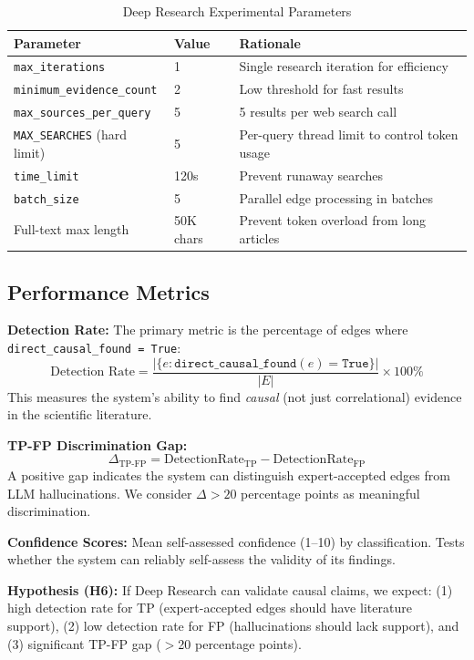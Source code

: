 \begin{table}[H]
\centering
\caption{Deep Research Experimental Parameters}
\label{tab:dr_params}
\footnotesize
\begin{tabular}{@{}l l l@{}}
\toprule
\textbf{Parameter} & \textbf{Value} & \textbf{Rationale} \\
\midrule
\texttt{max\_iterations} & 1 & Single research iteration for efficiency \\
\texttt{minimum\_evidence\_count} & 2 & Low threshold for fast results \\
\texttt{max\_sources\_per\_query} & 5 & 5 results per web search call \\
\texttt{MAX\_SEARCHES} (hard limit) & 5 & Per-query thread limit to control token usage \\
\texttt{time\_limit} & 120s & Prevent runaway searches \\
\texttt{batch\_size} & 5 & Parallel edge processing in batches \\
Full-text max length & 50K chars & Prevent token overload from long articles \\
\bottomrule
\end{tabular}
\end{table}

\subsection{Performance Metrics}

\textbf{Detection Rate:} The primary metric is the percentage of edges where \texttt{direct\_causal\_found = True}:
\[
\text{Detection Rate} = \frac{|\{e : \texttt{direct\_causal\_found}(e) = \texttt{True}\}|}{|E|} \times 100\%
\]
This measures the system's ability to find \textit{causal} (not just correlational) evidence in the scientific literature.

\textbf{TP-FP Discrimination Gap:}
\[
\Delta_{\text{TP-FP}} = \text{DetectionRate}_{\text{TP}} - \text{DetectionRate}_{\text{FP}}
\]
A positive gap indicates the system can distinguish expert-accepted edges from LLM hallucinations. We consider $\Delta > 20$ percentage points as meaningful discrimination.

\textbf{Confidence Scores:} Mean self-assessed confidence (1--10) by classification. Tests whether the system can reliably self-assess the validity of its findings.

\textbf{Hypothesis (H6):} If Deep Research can validate causal claims, we expect: (1) high detection rate for TP (expert-accepted edges should have literature support), (2) low detection rate for FP (hallucinations should lack support), and (3) significant TP-FP gap ($>$20 percentage points).

